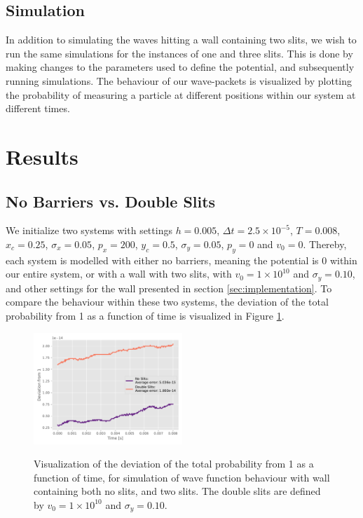 \documentclass[10pt, nofootinbib, twocolumn]{revtex4-1}
\begin{document}
\subsection{Simulation}
In addition to simulating the waves hitting a wall containing two slits, we wish to run the same simulations for the instances of one and three slits. This is done by making changes to the parameters used to define the potential, and subsequently running simulations. The behaviour of our wave-packets is visualized by plotting the probability of measuring a particle at different positions within our system at different times. 



\clearpage
\section{Results}\label{sec:results}
\subsection{No Barriers vs. Double Slits}
We initialize two systems with settings $h = 0.005$, $\Delta t = 2.5\times10^{-5}$, $T = 0.008$, $x_c = 0.25$, $\sigma_x = 0.05$, $p_x = 200$, $y_c = 0.5$, $\sigma_y = 0.05$, $p_y = 0$ and $v_0 = 0$. Thereby, each system is modelled with either no barriers, meaning the potential is 0 within our entire system, or with a wall with two slits, with $v_0 = 1\times10^{10}$ and $\sigma_y = 0.10$, and other settings for the wall presented in section \ref{sec:implementation}. To compare the behaviour within these two systems, the deviation of the total probability from 1 as a function of time is visualized in Figure \ref{fig:prob7}.

\begin{figure}[H]
    \caption{Visualization of the deviation of the total probability from 1 as a function of time, for simulation of wave function behaviour with wall containing both no slits, and two slits. The double slits are defined by $v_0 = 1\times10^{10}$ and $\sigma_y = 0.10$.}
    \centering
    \includegraphics[width = 0.5\textwidth]{figures/deviation.pdf} 
    \label{fig:prob7}
\end{figure} 
\end{document}
